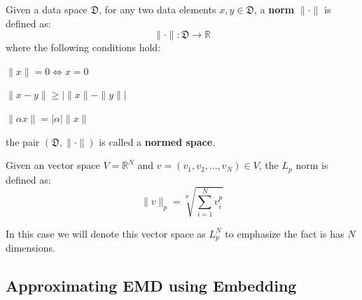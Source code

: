 \begin{definition}
Given a data space $\mathfrak{D}$, for any two data elements  $x,y \in \mathfrak{D}$, a \textbf{norm} $\|\cdot\|$ is defined as:
\begin{equation}
\|\cdot\|: \mathfrak{D} \longrightarrow \mathbb{R}
\end{equation}
where the following conditions hold:
\begin{compactitem}
\item $\|x\|=0 \Leftrightarrow x=0$
\item $\|x-y\| \geq|\|x\|-\|y\||$
\item $\|\alpha x\|=|\alpha|\|x\|$
\end{compactitem}
the pair $\left(\mathfrak{D},\|\cdot\|\right)$ is called a \textbf{normed space}.
\label{def:norm}
\end{definition}


\begin{definition}
Given an vector space $V=\mathbb{R}^N$ and $v=(v_1,v_2,...,v_N) \in V$, the $L_p$ norm is defined as:
\begin{equation}
\|v\|_p=\sqrt[p]{\sum\limits_{i=1}^N v_i^p}
\end{equation}
\label{lp}
\end{definition}
In this case we will denote this vector space as $L_p^N$ to emphasize the fact is has $N$ dimensions.

\subsection{Approximating EMD using Embedding}
\label{subsec:approximating_emd_using_embedding}


